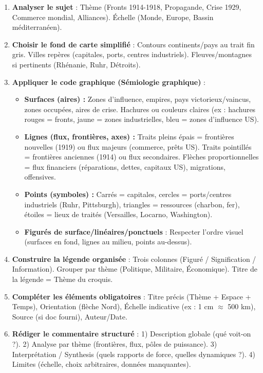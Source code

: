 \documentclass[11pt]{article}
\begin{document}
\begin{methode}
\begin{enumerate}
\item \textbf{Analyser le sujet} : Thème (Fronts 1914-1918, Propagande, Crise 1929, Commerce mondial, Alliances). Échelle (Monde, Europe, Bassin méditerranéen).
\item \textbf{Choisir le fond de carte simplifié} : Contours continents/pays au trait fin gris. Villes repères (capitales, ports, centres industriels). Fleuves/montagnes si pertinents (Rhénanie, Ruhr, Détroits).
\item \textbf{Appliquer le code graphique (Sémiologie graphique)} :
\begin{itemize}
\item \textbf{Surfaces (aires) :} Zones d'influence, empires, pays victorieux/vaincus, zones occupées, aires de crise. Hachures ou couleurs claires (ex : hachures rouges = fronts, jaune = zones industrielles, bleu = zones d'influence US).
\item \textbf{Lignes (flux, frontières, axes) :} Traits pleins épais = frontières nouvelles (1919) ou flux majeurs (commerce, prêts US). Traits pointillés = frontières anciennes (1914) ou flux secondaires. Flèches proportionnelles = flux financiers (réparations, dettes, capitaux US), migrations, offensives.
\item \textbf{Points (symboles) :} Carrés = capitales, cercles = ports/centres industriels (Ruhr, Pittsburgh), triangles = ressources (charbon, fer), étoiles = lieux de traités (Versailles, Locarno, Washington).
\item \textbf{Figurés de surface/linéaires/ponctuels} : Respecter l'ordre visuel (surfaces en fond, lignes au milieu, points au-dessus).
\end{itemize}
\item \textbf{Construire la légende organisée} : Trois colonnes (Figuré / Signification / Information). Grouper par thème (Politique, Militaire, Économique). Titre de la légende = Thème du croquis.
\item \textbf{Compléter les éléments obligatoires} : Titre précis (Thème + Espace + Temps), Orientation (flèche Nord), Échelle indicative (ex : 1 cm $\approx$ 500 km), Source (si doc fourni), Auteur/Date.
\item \textbf{Rédiger le commentaire structuré} : 1) Description globale (qué voit-on ?). 2) Analyse par thème (frontières, flux, pôles de puissance). 3) Interprétation / Synthesis (quels rapports de force, quelles dynamiques ?). 4) Limites (échelle, choix arbitraires, données manquantes).
\end{enumerate}
\end{methode}
\end{document}
